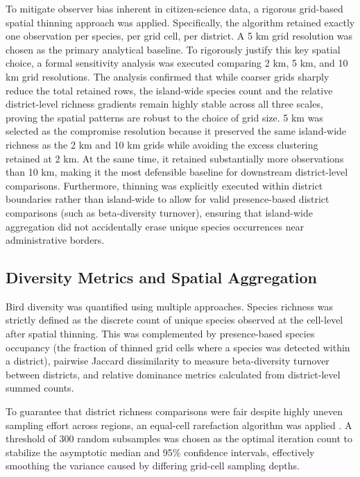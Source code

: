 \documentclass[conference]{IEEEtran}
\begin{document}
To mitigate observer bias inherent in citizen-science data, a rigorous grid-based spatial thinning approach was applied. Specifically, the algorithm retained exactly one observation per species, per grid cell, per district. A 5 km grid resolution was chosen as the primary analytical baseline. To rigorously justify this key spatial choice, a formal sensitivity analysis was executed comparing 2 km, 5 km, and 10 km grid resolutions. The analysis confirmed that while coarser grids sharply reduce the total retained rows, the island-wide species count and the relative district-level richness gradients remain highly stable across all three scales, proving the spatial patterns are robust to the choice of grid size. 5 km was selected as the compromise resolution because it preserved the same island-wide richness as the 2 km and 10 km grids while avoiding the excess clustering retained at 2 km. At the same time, it retained substantially more observations than 10 km, making it the most defensible baseline for downstream district-level comparisons. Furthermore, thinning was explicitly executed within district boundaries rather than island-wide to allow for valid presence-based district comparisons (such as beta-diversity turnover), ensuring that island-wide aggregation did not accidentally erase unique species occurrences near administrative borders.

\subsection{Diversity Metrics and Spatial Aggregation}

Bird diversity was quantified using multiple approaches. Species richness was strictly defined as the discrete count of unique species observed at the cell-level after spatial thinning. This was complemented by presence-based species occupancy (the fraction of thinned grid cells where a species was detected within a district), pairwise Jaccard dissimilarity \cite{ref26} to measure beta-diversity turnover between districts, and relative dominance metrics calculated from district-level summed counts. 

To guarantee that district richness comparisons were fair despite highly uneven sampling effort across regions, an equal-cell rarefaction algorithm was applied \cite{ref17}. A threshold of 300 random subsamples was chosen as the optimal iteration count to stabilize the asymptotic median and 95\% confidence intervals, effectively smoothing the variance caused by differing grid-cell sampling depths.
\end{document}
